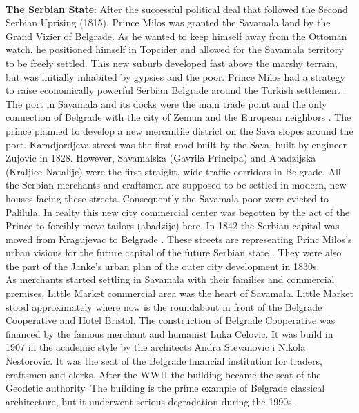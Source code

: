 \documentclass[11pt]{report}
\begin{document}
\\
\textbf{The Serbian State}:
After the successful political deal that followed the Second Serbian Uprising (1815), Prince Milos was granted the Savamala land by the Grand Vizier of Belgrade. As he wanted to keep himself away from the Ottoman watch, he positioned himself in Topcider and allowed for the Savamala territory to be freely settled. This new suburb developed fast above the marshy terrain, but was initially inhabited by gypsies and the poor.
Prince Milos had a strategy to raise economically powerful Serbian Belgrade around the Turkish settlement \cite{bureau savamala}.
The port in Savamala and its docks were the main trade point and the only connection of Belgrade with the city of Zemun and the European neighbors \cite{Roter Blagojevic in Doytchinov 2015}. The prince planned to develop a new mercantile district on the Sava slopes around the port. 
Karadjordjeva street was the first road built by the Sava, built by engineer Zujovic in 1828. However, Savamalska (Gavrila Principa) and Abadzijska (Kraljice Natalije) were the first straight, wide traffic corridors in Belgrade. All  the  Serbian  merchants  and  craftsmen  are  supposed  to  be settled in modern, new  houses facing these streets\cite{Roter Blagojevic in Doytchinov 2015}.
Consequently the Savamala poor were evicted to Palilula. 
In realty this new city commercial center was begotten by the act of the Prince to forcibly move tailors (abadzije) here.
In 1842 the Serbian capital was moved from Kragujevac to Belgrade \cite{Roter Blagojevic in Doytchinov 2015}.
These streets are representing Princ Milos’s urban visions for the future capital of the future Serbian state \cite{Roter Blagojevic in Doytchinov 2015}. They were also the part of the Janke’s urban plan of the outer city development in 1830s\cite{Blagojevic 2009}. 
\\
As merchants started settling in Savamala with their families and commercial premises, Little Market commercial area was the heart of Savamala.
Little Market stood approximately where now is the roundabout in front of the Belgrade Cooperative and Hotel Bristol.
The construction of Belgrade Cooperative was financed by the famous merchant and humanist Luka Celovic. It was build in 1907 in the academic style by the architects Andra Stevanovic i Nikola Nestorovic. It was the seat of the Belgrade financial institution for traders, craftsmen and clerks. After the WWII the building became the seat of the Geodetic authority.
The building is the prime example of Belgrade classical architecture, but it underwent serious degradation during the 1990s.
\end{document}
